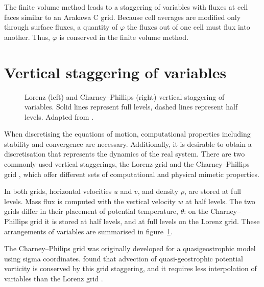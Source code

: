 The finite volume method leads to a staggering of variables with fluxes at cell faces similar to an Arakawa C grid.  Because cell averages are modified only through surface fluxes, a quantity of $\varphi$ the fluxes out of one cell must flux into another.  Thus, $\varphi$ is conserved in the finite volume method.

\section{Vertical staggering of variables}
\label{sec:theory:staggering}


\begin{figure}
	\centering
	
	\caption{Lorenz (left) and Charney--Phillips (right) vertical staggering of variables.  Solid lines represent full levels, dashed lines represent half levels.  Adapted from \textcite{holdaway2013}.}
	\label{fig:theory:staggering}
\end{figure}

When discretising the equations of motion, computational properties including stability and convergence are necessary.  Additionally, it is desirable to obtain a discretisation that represents the dynamics of the real system.  There are two commonly-used vertical staggerings, the Lorenz grid \autocite{lorenz1960} and the Charney--Phillips grid \autocite{charney-phillips1953}, which offer different sets of computational and physical mimetic properties.

In both grids, horizontal velocities $u$ and $v$, and density $\rho$, are stored at full levels.  Mass flux is computed with the vertical velocity $w$ at half levels.  The two grids differ in their placement of potential temperature, $\theta$: on the Charney--Phillips grid it is stored at half levels, and at full levels on the Lorenz grid.  These arrangements of variables are summarised in figure~\ref{fig:theory:staggering}.

The Charney--Philips grid was originally developed for a quasigeostrophic model using sigma coordinates.  \textcite{arakawa-moorthi1988} found that advection of quasi-geostrophic potential vorticity is conserved by this grid staggering, and it requires less interpolation of variables than the Lorenz grid \autocite{holdaway2013}. 

